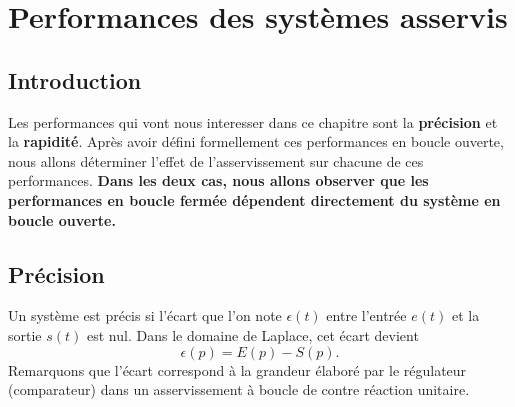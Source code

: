 \chapter[Performances des systèmes]
{Performances des systèmes asservis\label{chap-perf}}
\minitoc
\newpage
\section{Introduction}
Les performances qui vont nous interesser dans 
ce chapitre sont la \textbf{précision} et la \textbf{rapidité}.
Après avoir défini formellement ces performances en boucle ouverte, 
nous allons déterminer l'effet de l'asservissement sur chacune de 
ces performances. \textbf{Dans les deux cas, nous allons observer que 
les performances en boucle fermée dépendent directement du système 
en boucle ouverte.}
\section{Précision}
Un système est précis si l'écart que l'on note $\epsilon(t)$ 
entre l'entrée $e(t)$ et la sortie $s(t)$ est nul.
Dans le domaine de Laplace, cet écart devient 
\[
\epsilon(p)=E(p)-S(p).
\]
Remarquons que l'écart correspond à la grandeur élaboré par le régulateur 
(comparateur) dans un asservissement à boucle de contre réaction unitaire.


